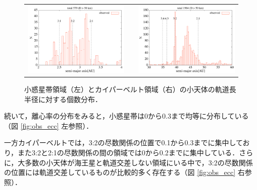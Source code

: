 \documentclass[11pt,a4paper,oneside,onecolumn]{jreport}
\begin{document}
\begin{figure}[H]
\begin{tabular}{ccc}
\begin{minipage}[t]{0.45\hsize}
\centering
\includegraphics[width=8cm]{./image/mainbelt_histogram.pdf}
\end{minipage} &
\begin{minipage}[t]{0.1\hsize}
\end{minipage} &
\begin{minipage}[t]{0.45\hsize}
\centering
\includegraphics[width=8cm]{./image/kuiperbelt_histogram.pdf}
\end{minipage}\\
%
\end{tabular}
\caption{小惑星帯領域（左）とカイパーベルト領域（右）の小天体の軌道長半径に対する個数分布．\label{fig:obs_histogram}}
\end{figure}

続いて，離心率の分布をみると，小惑星帯は0から0.3まで均等に分布している（図 \ref{fig:obs_ecc} 左参照）．

一方カイパーベルトでは，3:2の尽数関係の位置で0.1から0.3までに集中しており，また3:2と2:1の尽数関係の間の領域では0から0.2までに集中している．さらに，大多数の小天体が海王星と軌道交差しない領域にいる中で，3:2の尽数関係の位置には軌道交差しているものが比較的多く存在する（図 \ref{fig:obs_ecc} 右参照）．
\end{document}
